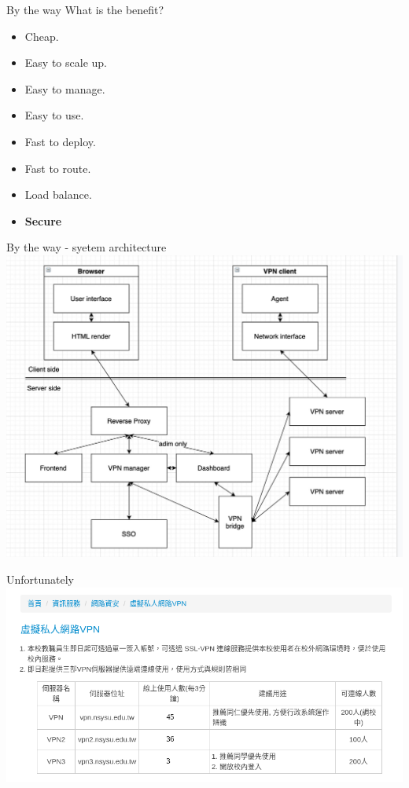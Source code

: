 \documentclass{beamer}
\begin{document}
\begin{CJK*}{UTF8}{bsmi}
  \begin{frame}{By the way}
    What is the benefit?
    \begin{multicols*}{2}
      \begin{itemize}
        \item Cheap.
        \item Easy to scale up.
        \item Easy to manage.
        \item Easy to use.
        \item Fast to deploy.
        \item Fast to route.
        \item Load balance.
        \item {\color{secureColor}\bf Secure}
      \end{itemize}
    \end{multicols*}
  \end{frame}
  \begin{frame}{By the way - syetem architecture}
    \centering
    \includegraphics[width=.8\textwidth]{1481224.jpg}
  \end{frame}

  \begin{frame}{Unfortunately}
    \includegraphics[width=\textwidth]{Screenshot_2021-07-02_10-14-09.png}
  \end{frame}


\end{CJK*}
\end{document}
